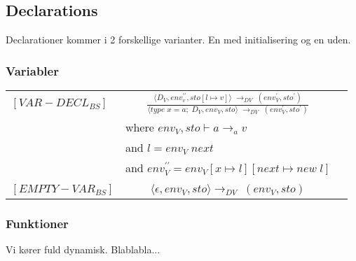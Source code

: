 \noindent \subsection{Declarations}
Declarationer kommer i 2 forskellige varianter. En med initialisering og en uden.


\subsubsection*{Variabler}

\begin{semantik}
    \bgroup
    \def\arraystretch{1.5}
    \begin{table}[H]
    \centering
    \begin{tabular}{l c l}
        
        $[VAR-DECL_{BS}]$ & $
        \frac{\langle D_V, env_v^{\prime\prime}, sto[l \mapsto v] \rangle\;\rightarrow_{DV}\; (env_V^\prime, sto^\prime)}
        {\langle type\; x = a;\; D_V, env_V, sto \rangle\; \rightarrow_{DV}\; (env_V^\prime, sto^\prime)}
        $ & \\
        
        & \multicolumn{1}{l}{where $ env_V, sto \vdash a \rightarrow_a v $}\\
        & \multicolumn{1}{l}{and $ l = env_V\; next $}\\
        & \multicolumn{1}{l}{and $ env_V^{\prime\prime} = env_V[x \mapsto l] [next \mapsto new\;l] $}\\
        
        &&\\
        
        $[EMPTY-VAR_{BS}]$ & $
        \langle \epsilon, env_V, sto \rangle \rightarrow_{DV}\; (env_V, sto) 
        $
        
    \end{tabular}
    \label{tab:variabler}
    \end{table}
    \egroup
    \caption{Deklaration af variabler}
\end{semantik}


\subsubsection*{Funktioner}

Vi kører fuld dynamisk. Blablabla...


